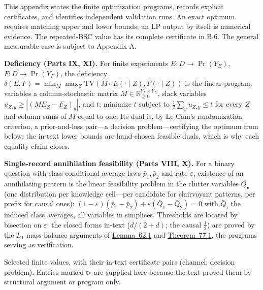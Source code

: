 
This appendix states the finite optimization programs, records explicit certificates, and identifies independent validation runs. An exact optimum requires matching upper and lower bounds; an LP output by itself is numerical evidence. The repeated-BSC value has its complete certificate in B.6. The general measurable case is subject to Appendix A.


\textbf{Deficiency (Parts IX, XI).} For finite experiments \(E : D \to \Pr(Y_E)\), \(F : D \to \Pr(Y_F)\), the deficiency \(\delta(E, F) = \min_M \max_Z \mathrm{TV}(M \circ E(\cdot \mid Z), F(\cdot \mid Z))\) is the linear program: variables a column-stochastic matrix \(M \in \mathbb{R}^{Y_F \times Y_E}_{\ge 0}\), slack variables \(u_{Z,y} \ge |(M E_Z - F_Z)_y|\), and \(t\); minimize \(t\) subject to \(\tfrac12 \sum_y u_{Z,y} \le t\) for every \(Z\) and column sums of \(M\) equal to one. Its dual is, by Le Cam's randomization criterion, a prior-and-loss pair---\hspace{0pt}a decision problem---\hspace{0pt}certifying the optimum from below; the in-text lower bounds are hand-chosen feasible duals, which is why each equality claim closes.

\textbf{Single-record annihilation feasibility (Parts VIII, X).} For a binary question with class-conditional average laws \(\bar p_1, \bar p_2\) and rate \(\varepsilon\), existence of an annihilating pattern is the linear feasibility problem in the clutter variables \(Q_\bullet\) (one distribution per knowledge cell---\hspace{0pt}per candidate for clairvoyant patterns, per prefix for causal ones): \((1-\varepsilon)(\bar p_1 - \bar p_2) + \varepsilon(\bar Q_1 - \bar Q_2) = 0\) with \(\bar Q_i\) the induced class averages, all variables in simplices. Thresholds are located by bisection on \(\varepsilon\); the closed forms in-text (\(d/(2+d)\); the causal \(\tfrac12\)) are proved by the \(L_1\) mass-balance arguments of \hyperlink{stmt:62.1}{Lemma~62.1} and \hyperlink{stmt:77.1}{Theorem~77.1}, the programs serving as verification.


Selected finite values, with their in-text certificate pairs (channel; decision problem). Entries marked \(\triangleright\) are supplied here because the text proved them by structural argument or program only.

